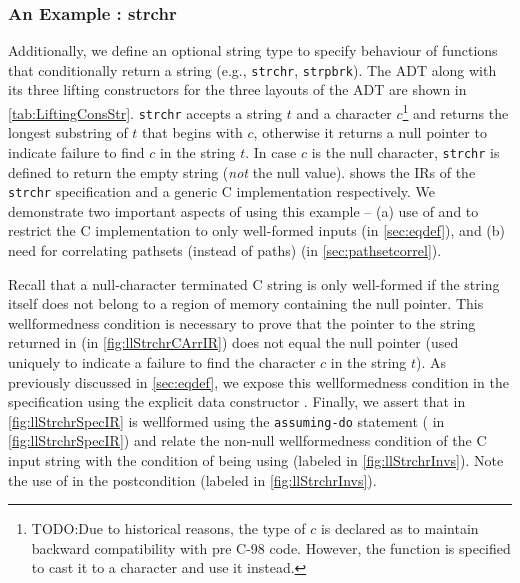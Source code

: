 \subsubsection{An Example : strchr}
\label{sec:strchrexample}
Additionally, we define an optional string type  to specify
behaviour of functions that conditionally return a string (e.g., {\tt strchr}, {\tt strpbrk}).
The  ADT along with its three lifting constructors for the three layouts of the  ADT
are shown in \cref{tab:LiftingConsStr}.
{\tt strchr} accepts a string $t$ and a character $c$\footnote{TODO:Due to historical reasons, the type of $c$ is declared as 
to maintain backward compatibility with pre C-98 code.
However, the function is specified to cast it to a character and use it instead.} and returns
the longest substring of $t$ that begins with $c$, otherwise it returns a null pointer to indicate
failure to find $c$ in the string $t$.
In case $c$ is the null character, {\tt strchr} is defined to return the empty string ({\em not} the null value).
 shows the IRs of the {\tt strchr} \SpecL{} specification and
a generic C implementation respectively.
We demonstrate two important aspects of \toolName{} using this example -- (a) use of \sdef{} and \pre{} to restrict the C implementation
to only well-formed inputs (in \cref{sec:eqdef}),
and (b) need for correlating pathsets (instead of paths) (in \cref{sec:pathsetcorrel}).

Recall that a null-character terminated C string is only well-formed if the string itself does not belong to a region of memory containing the null pointer.
This wellformedness condition is necessary to prove that the pointer to the string returned in  (in \cref{fig:llStrchrCArrIR})
does not equal the null pointer (used uniquely to indicate a failure to find the character $c$ in the string $t$).
As previously discussed in \cref{sec:eqdef}, we expose this wellformedness condition in the specification using
the explicit  data constructor .
Finally, we assert that  in \cref{fig:llStrchrSpecIR} is wellformed using the {\tt assuming-do} statement
( in \cref{fig:llStrchrSpecIR}) and relate the non-null wellformedness condition of the C input string 
with the condition of  being  using \pre{} (labeled  in \cref{fig:llStrchrInvs}).
Note the use of  in the postcondition (labeled  in \cref{fig:llStrchrInvs}).


